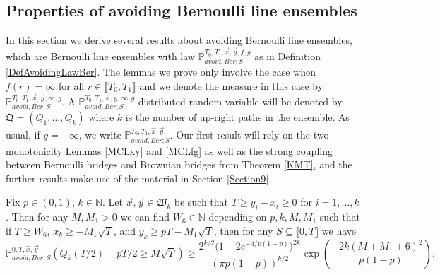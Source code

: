 %
\subsection{Properties of avoiding Bernoulli line ensembles}\label{Section3.3}  In this section we derive several results about avoiding Bernoulli line ensembles, which are Bernoulli line ensembles with law $\mathbb{P}_{avoid, Ber;
S}^{T_0,T_1, \vec{x}, \vec{y}, f, g}$ as in Definition \ref{DefAvoidingLawBer}. The lemmas we prove only involve the case when $f(r) = \infty$ for all $r \in \llbracket T_0, T_1 \rrbracket$ and we denote the measure in this case by $\mathbb{P}_{avoid, Ber;S}^{T_0,T_1, \vec{x}, \vec{y}, \infty, g}$. A $\mathbb{P}_{avoid, Ber;S}^{T_0,T_1, \vec{x}, \vec{y}, \infty, g}$-distributed random variable will be denoted by $\mathfrak{Q} = (Q_1, \dots, Q_k)$ where $k$ is the number of up-right paths in the ensemble. As usual, if $g=-\infty$, we write $\mathbb{P}_{avoid, Ber;S}^{T_0,T_1, \vec{x}, \vec{y}}$. Our first result will rely on the two monotonicity Lemmas \ref{MCLxy} and \ref{MCLfg} as well as the strong coupling between Bernoulli bridges and Brownian bridges from Theorem \ref{KMT}, and the further results make use of the material in Section \ref{Section9}.


\begin{lemma}\label{prob19}
	Fix $p\in(0,1)$, $k\in\mathbb{N}$. Let $\vec{x},\vec{y}\in\mathfrak{W}_k$ be such that $T \geq y_i - x_i \geq 0$ for $i=1,\dots,k$. Then for any $M,M_1 > 0$ we can find $W_6\in\mathbb{N}$ depending on $p,k,M,M_1$ such that if $T\geq W_6$, $x_k \geq - M_1\sqrt{T}$, and $y_k \geq pT - M_1\sqrt{T}$, then for any $S\subseteq \llbracket 0,T\rrbracket$ we have
	\begin{equation}\label{19ineq}
	\mathbb{P}^{0,T,\vec{x},\vec{y}}_{avoid, Ber; S}\left(Q_k(T/2) - pT/2 \geq M\sqrt{T}\right) \geq \frac{2^{k/2}\big(1-2e^{-4/p(1-p)}\big)^{2k}}{(\pi p(1-p))^{k/2}}\exp\left(-\frac{2k(M+M_1+6)^2}{p(1-p)}\right).
	\end{equation}
\end{lemma}

